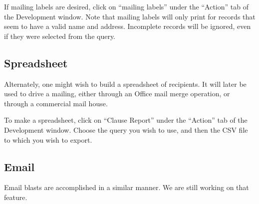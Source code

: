 \documentclass[11pt]{article}
\begin{document}
If mailing labels are desired, click on ``mailing labels'' under the ``Action'' tab of the Development window.  Note that mailing labels will only print for records that seem to have a valid name and address.  Incomplete records will be ignored, even if they were selected from the query.

\subsection{Spreadsheet}

Alternately, one might wish to build a spreadsheet of recipients.  It will later be used to drive a mailing, either through an Office mail merge operation, or through a commercial mail house.  

To make a spreadsheet, click on ``Clause Report'' under the ``Action'' tab of the Development window.  Choose the query you wish to use, and then the CSV file to which you wish to export.

\subsection{Email}

Email blasts are accomplished in a similar manner.  We are still working on that feature.
\end{document}
